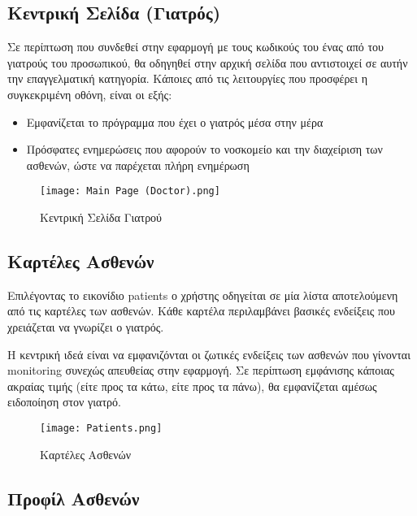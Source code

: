\documentclass{article}
\begin{document}
\subsection{Κεντρική Σελίδα (Γιατρός)}

Σε περίπτωση που συνδεθεί στην εφαρμογή με τους κωδικούς του ένας από του γιατρούς του προσωπικού, θα οδηγηθεί στην αρχική σελίδα που αντιστοιχεί σε αυτήν την επαγγελματική κατηγορία. Κάποιες από τις λειτουργίες που προσφέρει η συγκεκριμένη οθόνη, είναι οι εξής:

\begin{itemize}
  \item Εμφανίζεται το πρόγραμμα που έχει ο γιατρός μέσα στην μέρα
  \item Πρόσφατες ενημερώσεις που αφορούν το νοσκομείο και την διαχείριση των ασθενών, ώστε να παρέχεται πλήρη ενημέρωση
\end{itemize}

\vspace{0.3cm}

\begin{figure}[!htb]
\centering
\texttt{[image: Main Page (Doctor).png]}
\caption{\label{fig:main page} Κεντρική Σελίδα Γιατρού}
\end{figure}


\subsection{Καρτέλες Ασθενών}

Επιλέγοντας το εικονίδιο patients ο χρήστης οδηγείται σε μία λίστα αποτελούμενη από τις καρτέλες των ασθενών. Κάθε καρτέλα περιλαμβάνει βασικές ενδείξεις που χρειάζεται να γνωρίζει ο γιατρός. \par
Η κεντρική ιδεά είναι να εμφανιζόνται οι ζωτικές ενδείξεις των ασθενών που γίνονται monitoring συνεχώς απευθείας στην εφαρμογή. Σε περίπτωση εμφάνισης κάποιας ακραίας τιμής (είτε προς τα κάτω, είτε προς τα πάνω), θα εμφανίζεται αμέσως ειδοποίηση στον γιατρό. 

\vspace{0.3cm}

\begin{figure}[!htb]
\centering
\texttt{[image: Patients.png]}
\caption{\label{fig:patients cards} Καρτέλες Ασθενών}
\end{figure}

\newpage

\subsection{Προφίλ Ασθενών}
\end{document}
